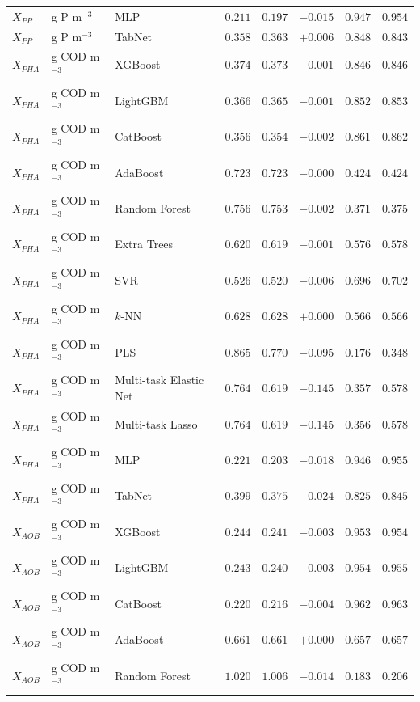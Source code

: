 \begin{longtable}{llp{3.1cm}rrrrr}
$X_{PP}$ & g P m$^{-3}$ & MLP & $0.211$ & $0.197$ & $-0.015$ & $0.947$ & $0.954$ \\
$X_{PP}$ & g P m$^{-3}$ & TabNet & $0.358$ & $0.363$ & $+0.006$ & $0.848$ & $0.843$ \\
$X_{PHA}$ & g COD m$^{-3}$ & XGBoost & $0.374$ & $0.373$ & $-0.001$ & $0.846$ & $0.846$ \\
$X_{PHA}$ & g COD m$^{-3}$ & LightGBM & $0.366$ & $0.365$ & $-0.001$ & $0.852$ & $0.853$ \\
$X_{PHA}$ & g COD m$^{-3}$ & CatBoost & $0.356$ & $0.354$ & $-0.002$ & $0.861$ & $0.862$ \\
$X_{PHA}$ & g COD m$^{-3}$ & AdaBoost & $0.723$ & $0.723$ & $-0.000$ & $0.424$ & $0.424$ \\
$X_{PHA}$ & g COD m$^{-3}$ & Random Forest & $0.756$ & $0.753$ & $-0.002$ & $0.371$ & $0.375$ \\
$X_{PHA}$ & g COD m$^{-3}$ & Extra Trees & $0.620$ & $0.619$ & $-0.001$ & $0.576$ & $0.578$ \\
$X_{PHA}$ & g COD m$^{-3}$ & SVR & $0.526$ & $0.520$ & $-0.006$ & $0.696$ & $0.702$ \\
$X_{PHA}$ & g COD m$^{-3}$ & $k$-NN & $0.628$ & $0.628$ & $+0.000$ & $0.566$ & $0.566$ \\
$X_{PHA}$ & g COD m$^{-3}$ & PLS & $0.865$ & $0.770$ & $-0.095$ & $0.176$ & $0.348$ \\
$X_{PHA}$ & g COD m$^{-3}$ & Multi-task Elastic Net & $0.764$ & $0.619$ & $-0.145$ & $0.357$ & $0.578$ \\
$X_{PHA}$ & g COD m$^{-3}$ & Multi-task Lasso & $0.764$ & $0.619$ & $-0.145$ & $0.356$ & $0.578$ \\
$X_{PHA}$ & g COD m$^{-3}$ & MLP & $0.221$ & $0.203$ & $-0.018$ & $0.946$ & $0.955$ \\
$X_{PHA}$ & g COD m$^{-3}$ & TabNet & $0.399$ & $0.375$ & $-0.024$ & $0.825$ & $0.845$ \\
$X_{AOB}$ & g COD m$^{-3}$ & XGBoost & $0.244$ & $0.241$ & $-0.003$ & $0.953$ & $0.954$ \\
$X_{AOB}$ & g COD m$^{-3}$ & LightGBM & $0.243$ & $0.240$ & $-0.003$ & $0.954$ & $0.955$ \\
$X_{AOB}$ & g COD m$^{-3}$ & CatBoost & $0.220$ & $0.216$ & $-0.004$ & $0.962$ & $0.963$ \\
$X_{AOB}$ & g COD m$^{-3}$ & AdaBoost & $0.661$ & $0.661$ & $+0.000$ & $0.657$ & $0.657$ \\
$X_{AOB}$ & g COD m$^{-3}$ & Random Forest & $1.020$ & $1.006$ & $-0.014$ & $0.183$ & $0.206$ \\

\end{longtable}
